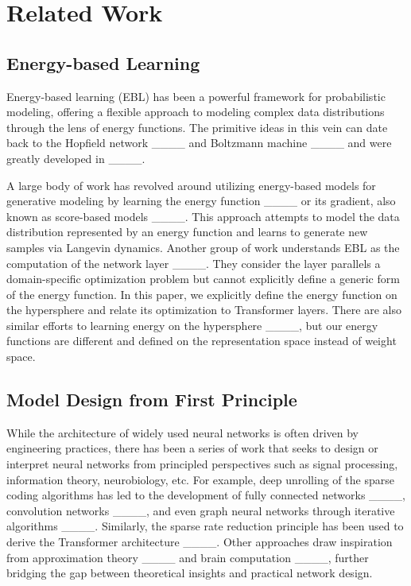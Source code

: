 \section{Related Work}
\label{section:label}

\subsection{Energy-based Learning}
Energy-based learning (EBL) has been a powerful framework for probabilistic modeling, offering a flexible approach to modeling complex data distributions through the lens of energy functions.
The primitive ideas in this vein can date back to the Hopfield network ____ and Boltzmann machine ____ and were greatly developed in ____. 

A large body of work has revolved around utilizing energy-based models for generative modeling by learning the energy function ____ or its gradient, also known as score-based models ____. This approach attempts to model the data distribution represented by an energy function and learns to generate new samples via Langevin dynamics. Another group of work understands EBL as the computation of the network layer ____. They consider the layer parallels a domain-specific optimization problem but cannot explicitly define a generic form of the energy function. In this paper, we explicitly define the energy function on the hypersphere and relate its optimization to Transformer layers. There are also similar efforts to learning energy on the hypersphere ____, but our energy functions are different and defined on the representation space instead of weight space.
\subsection{Model Design from First Principle}
While the architecture of widely used neural networks is often driven by engineering practices, there has been a series of work that seeks to design or interpret neural networks from principled perspectives such as signal processing, information theory, neurobiology, etc. For example, deep unrolling of the sparse coding algorithms has led to the development of fully connected networks ____, convolution networks ____, and even graph neural networks through iterative algorithms ____. Similarly, the sparse rate reduction principle has been used to derive the Transformer architecture ____. Other approaches draw inspiration from approximation theory ____ and brain computation ____, further bridging the gap between theoretical insights and practical network design. 


